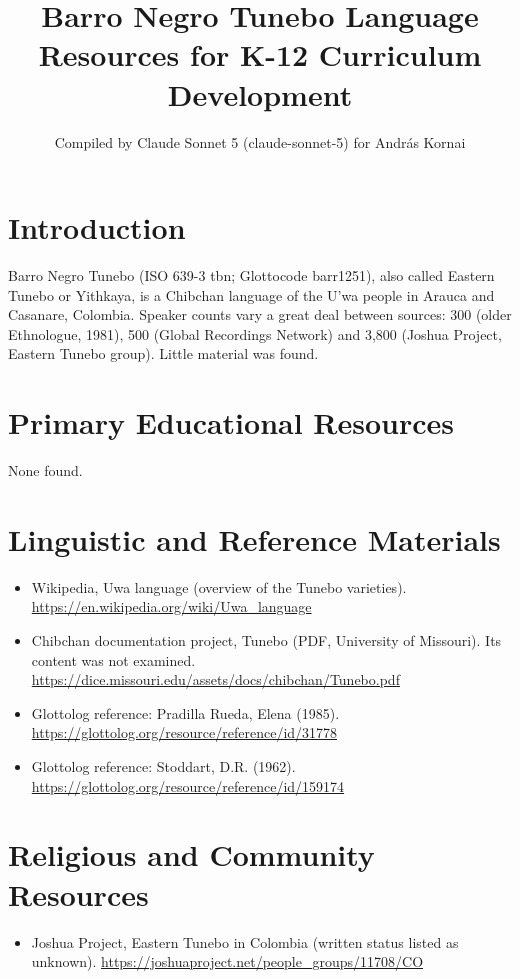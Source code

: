 \documentclass[12pt]{article}
\title{Barro Negro Tunebo Language Resources for K-12 Curriculum Development}
\author{Compiled by Claude Sonnet 5 (claude-sonnet-5) for Andr\'as Kornai}
\date{}
\begin{document}
\maketitle

\section{Introduction}
Barro Negro Tunebo (ISO 639-3 tbn; Glottocode barr1251), also called Eastern Tunebo or Yithkaya, is a Chibchan language of the U'wa people in Arauca and Casanare, Colombia. Speaker counts vary a great deal between sources: 300 (older Ethnologue, 1981), 500 (Global Recordings Network) and 3,800 (Joshua Project, Eastern Tunebo group). Little material was found.

\section{Primary Educational Resources}
None found.

\section{Linguistic and Reference Materials}
\begin{itemize}
\item Wikipedia, Uwa language (overview of the Tunebo varieties). \url{https://en.wikipedia.org/wiki/Uwa_language}
\item Chibchan documentation project, Tunebo (PDF, University of Missouri). Its content was not examined. \url{https://dice.missouri.edu/assets/docs/chibchan/Tunebo.pdf}
\item Glottolog reference: Pradilla Rueda, Elena (1985). \url{https://glottolog.org/resource/reference/id/31778}
\item Glottolog reference: Stoddart, D.R. (1962). \url{https://glottolog.org/resource/reference/id/159174}
\end{itemize}

\section{Religious and Community Resources}
\begin{itemize}
\item Joshua Project, Eastern Tunebo in Colombia (written status listed as unknown). \url{https://joshuaproject.net/people_groups/11708/CO}
\end{itemize}
\end{document}
